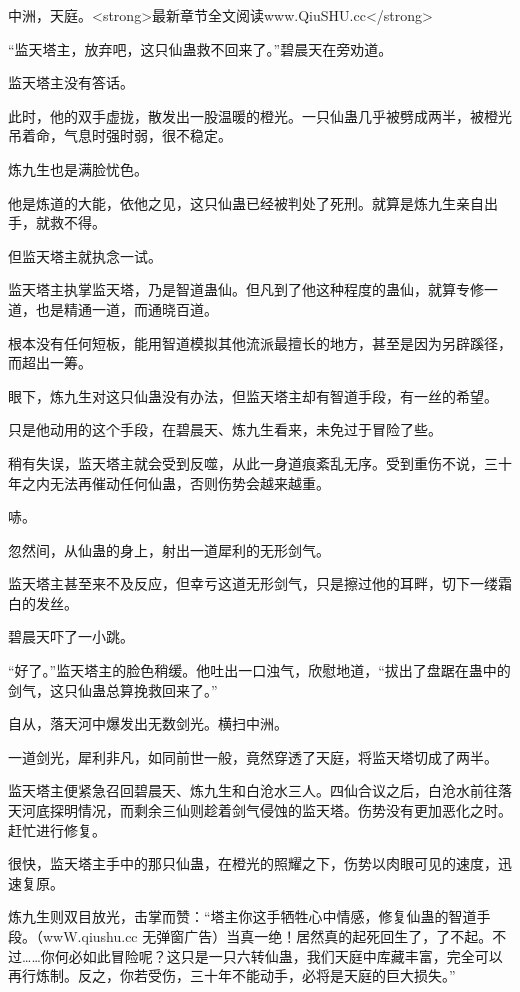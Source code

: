 
\begin{this_body}

中洲，天庭。<strong>最新章节全文阅读www.QiuSHU.cc</strong>

“监天塔主，放弃吧，这只仙蛊救不回来了。”碧晨天在旁劝道。

监天塔主没有答话。

此时，他的双手虚拢，散发出一股温暖的橙光。一只仙蛊几乎被劈成两半，被橙光吊着命，气息时强时弱，很不稳定。

炼九生也是满脸忧色。

他是炼道的大能，依他之见，这只仙蛊已经被判处了死刑。就算是炼九生亲自出手，就救不得。

但监天塔主就执念一试。

监天塔主执掌监天塔，乃是智道蛊仙。但凡到了他这种程度的蛊仙，就算专修一道，也是精通一道，而通晓百道。

根本没有任何短板，能用智道模拟其他流派最擅长的地方，甚至是因为另辟蹊径，而超出一筹。

眼下，炼九生对这只仙蛊没有办法，但监天塔主却有智道手段，有一丝的希望。

只是他动用的这个手段，在碧晨天、炼九生看来，未免过于冒险了些。

稍有失误，监天塔主就会受到反噬，从此一身道痕紊乱无序。受到重伤不说，三十年之内无法再催动任何仙蛊，否则伤势会越来越重。

哧。

忽然间，从仙蛊的身上，射出一道犀利的无形剑气。

监天塔主甚至来不及反应，但幸亏这道无形剑气，只是擦过他的耳畔，切下一缕霜白的发丝。

碧晨天吓了一小跳。

“好了。”监天塔主的脸色稍缓。他吐出一口浊气，欣慰地道，“拔出了盘踞在蛊中的剑气，这只仙蛊总算挽救回来了。”

自从，落天河中爆发出无数剑光。横扫中洲。

一道剑光，犀利非凡，如同前世一般，竟然穿透了天庭，将监天塔切成了两半。

监天塔主便紧急召回碧晨天、炼九生和白沧水三人。四仙合议之后，白沧水前往落天河底探明情况，而剩余三仙则趁着剑气侵蚀的监天塔。伤势没有更加恶化之时。赶忙进行修复。

很快，监天塔主手中的那只仙蛊，在橙光的照耀之下，伤势以肉眼可见的速度，迅速复原。

炼九生则双目放光，击掌而赞：“塔主你这手牺牲心中情感，修复仙蛊的智道手段。（wwW.qiushu.cc 无弹窗广告）当真一绝！居然真的起死回生了，了不起。不过……你何必如此冒险呢？这只是一只六转仙蛊，我们天庭中库藏丰富，完全可以再行炼制。反之，你若受伤，三十年不能动手，必将是天庭的巨大损失。”


\end{this_body}
